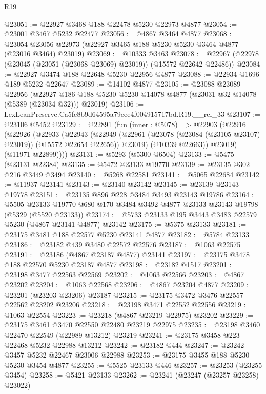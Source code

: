 \begin{lexlean}{R19}
\begin{coremodule}
@23051 := @22927 @3468 @188 @22478 @5230 @22973 @4877
@23054 := @23001 @3467 @5232 @22477
@23056 := @4867 @3464 @4877
@23068 := @23054 @23056 @22973 (@22927 @3465 @188 @5230 @5230 @3464 @4877 (@23016 @3464) @23019)
@23069 := @10333 @3463
@23078 := @22967 (@22978 (@23045 (@23051 (@23068 @23069) @23019)) (@15572 @22642 @22486))
@23084 := @22927 @3474 @188 @22648 @5230 @22956 @4877
@23088 := @22934 @1696 @189 @5232 @22647
@23089 := @14102 @4877
@23105 := @23088
    @23089
    @22956
    (@22927 @186 @188 @5230 @5230 @14078 @4877 (@23031 @32 @14078 (@5389 (@23034 @32))) @23019)
@23106 := LexLeanPreserve.Ca5fe8b9d64595a79eee4f004915717bd.R19.__rel_33
@23107 := @23106 @5452
@23129 := @22891
    (fun (inner : @5078) =>
    @22903
      (@22916
        (@22926
          (@22933
            (@22943
              (@22949
                (@22961 (@23078 (@23084 (@23105 @23107) @23019)) (@15572 @22654 @22656))
                @23019)
              (@10339 @22663))
            @23019)
          (@11971 @22899))))
@23131 := @5293 (@5300 @6504)
@23133 := @5475 (@23131 @22384)
@23135 := @5472 @23133 @19770
@23139 := @23135 @302 @216 @3449 @3494
@23140 := @5268 @22581
@23141 := @5065 @22684
@23142 := @11937 @23141
@23143 := @23140 @23142
@23145 := @23139 @23143 @19778
@23151 := @23135 @896 @228 @3484 @3493 @23143 @19786
@23164 := @5505
    @23133
    @19770
    @680
    @170
    @3484
    @3492
    @4877
    @23133
    @23143
    @19798
    (@5329 (@5520 @23133))
@23174 := @5733 @23133 @195 @3443 @3483 @22579 @5230 (@4867 @23141 @4877) @23142
@23175 := @5375 @23133
@23181 := @23175 @3481 @188 @22577 @5230 @23141 @4877
@23182 := @5784 @23133
@23186 := @23182 @439 @3480 @22572 @22576
@23187 := @1063 @22575
@23191 := @23186 (@4867 @23187 @4877) @23141
@23197 := @23175 @3478 @188 @22570 @5230 @23187 @4877
@23198 := @23182 @1517
@23201 := @23198 @3477 @22563 @22569
@23202 := @1063 @22566
@23203 := @4867 @23202
@23204 := @1063 @22568
@23206 := @4867 @23204 @4877
@23209 := @23201 (@23203 @23206) @23187
@23215 := @23175 @3472 @3476 @22557 @22562 @23202 @23206
@23218 := @23198 @3471 @22552 @22556
@23219 := @1063 @22554
@23223 := @23218 (@4867 @23219 @22975) @23202
@23229 := @23175 @3461 @3470 @22550 @22480 @23219 @22975
@23235 := @23198 @3460 @22470 @22549 (@22989 @13212) @23219
@23241 := @23175 @3458 @223 @22468 @5232 @22988 @13212
@23242 := @23182 @444
@23247 := @23242 @3457 @5232 @22467 @23006 @22988
@23253 := @23175 @3455 @188 @5230 @5230 @3454 @4877
@23255 := @5525 @23133 @446
@23257 := @23253 (@23255 @3454)
@23258 := @5421 @23133
@23262 := @23241 (@23247 (@23257 @23258) @23022)

\end{coremodule}
\end{lexlean}
